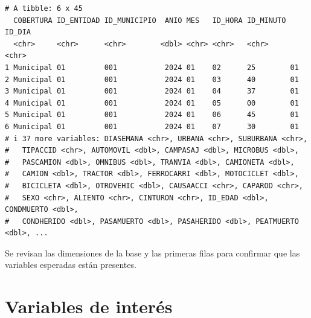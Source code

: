 \documentclass[
  spanish,
  11pt,
  letterpaper,
]{book}
\begin{document}
\begin{verbatim}
# A tibble: 6 x 45
  COBERTURA ID_ENTIDAD ID_MUNICIPIO  ANIO MES   ID_HORA ID_MINUTO ID_DIA
  <chr>     <chr>      <chr>        <dbl> <chr> <chr>   <chr>     <chr> 
1 Municipal 01         001           2024 01    02      25        01    
2 Municipal 01         001           2024 01    03      40        01    
3 Municipal 01         001           2024 01    04      37        01    
4 Municipal 01         001           2024 01    05      00        01    
5 Municipal 01         001           2024 01    06      45        01    
6 Municipal 01         001           2024 01    07      30        01    
# i 37 more variables: DIASEMANA <chr>, URBANA <chr>, SUBURBANA <chr>,
#   TIPACCID <chr>, AUTOMOVIL <dbl>, CAMPASAJ <dbl>, MICROBUS <dbl>,
#   PASCAMION <dbl>, OMNIBUS <dbl>, TRANVIA <dbl>, CAMIONETA <dbl>,
#   CAMION <dbl>, TRACTOR <dbl>, FERROCARRI <dbl>, MOTOCICLET <dbl>,
#   BICICLETA <dbl>, OTROVEHIC <dbl>, CAUSAACCI <chr>, CAPAROD <chr>,
#   SEXO <chr>, ALIENTO <chr>, CINTURON <chr>, ID_EDAD <dbl>, CONDMUERTO <dbl>,
#   CONDHERIDO <dbl>, PASAMUERTO <dbl>, PASAHERIDO <dbl>, PEATMUERTO <dbl>, ...
\end{verbatim}

\begin{tcolorbox}[enhanced jigsaw, arc=.35mm, bottomrule=.15mm, bottomtitle=1mm, breakable, colback=white, colbacktitle=quarto-callout-note-color!10!white, colframe=quarto-callout-note-color-frame, coltitle=black, left=2mm, leftrule=.75mm, opacityback=0, opacitybacktitle=0.6, rightrule=.15mm, title=\textcolor{quarto-callout-note-color}{\faInfo}\hspace{0.5em}{Explicación del código}, titlerule=0mm, toprule=.15mm, toptitle=1mm]

Se revisan las dimensiones de la base y las primeras filas para
confirmar que las variables esperadas están presentes.

\end{tcolorbox}

\section{Variables de interés}\label{variables-de-interuxe9s}
\end{document}
